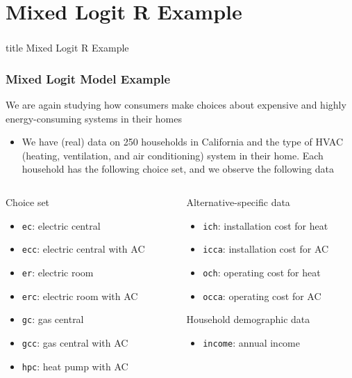 \documentclass{beamer}\usepackage[]{graphicx}\usepackage[]{color}
\begin{document}
\section{Mixed Logit R Example}
\label{example}
\begin{frame}\frametitle{}
    \vfill
    \centering
    \begin{beamercolorbox}[center]{title}
        \Large Mixed Logit R Example
    \end{beamercolorbox}
    \vfill
\end{frame}

\begin{frame}\frametitle{Mixed Logit Model Example}
    We are again studying how consumers make choices about expensive and highly energy-consuming systems in their homes
    \begin{itemize}
    	\item We have (real) data on 250 households in California and the type of HVAC (heating, ventilation, and air conditioning) system in their home. Each household has the following choice set, and we observe the following data
    \end{itemize}
    \vspace{2ex}
    \begin{columns}
    	\begin{column}{0.5\textwidth}
		    Choice set
		    \begin{itemize}
		    	\item \texttt{ec}: electric central
		    	\item \texttt{ecc}: electric central with AC
		    	\item \texttt{er}: electric room
		    	\item \texttt{erc}: electric room with AC
		    	\item \texttt{gc}: gas central
		    	\item \texttt{gcc}: gas central with AC
		    	\item \texttt{hpc}: heat pump with AC
		    \end{itemize}
	    \end{column}
	    \begin{column}{0.5\textwidth}
		    Alternative-specific data
		    \begin{itemize}
		    	\item \texttt{ich}: installation cost for heat
		    	\item \texttt{icca}: installation cost for AC
		    	\item \texttt{och}: operating cost for heat
		    	\item \texttt{occa}: operating cost for AC
		    \end{itemize}
		    \vspace{2ex}
		    Household demographic data
		    \begin{itemize}
		    	\item \texttt{income}: annual income
		    \end{itemize}
		    \vspace{1ex}
		\end{column}
    \end{columns}
\end{frame}
\end{document}
